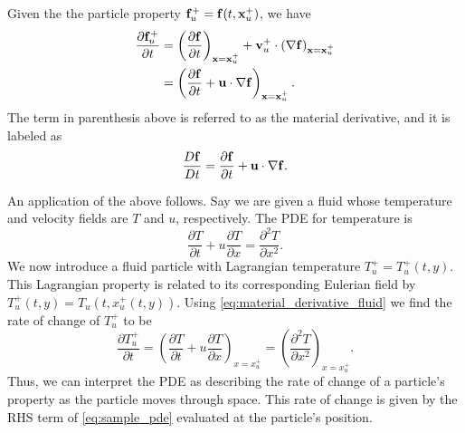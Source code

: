 \documentclass[oneside,a4paper,11pt]{report}
\begin{document}
Given the the particle property $\mathbf{f}^+_u = \mathbf{f}(t,\mathbf{x}^+_u)$, we have
\begin{align}
\label{eq:material_derivative_fluid}
\frac{\partial \mathbf{f}^+_u}{\partial t} &=\left(\frac{\partial \mathbf{f}}{\partial t}\right)_{\mathbf{x}=\mathbf{x}^+_u} + \mathbf{v}^+_u \cdot \left(\nabla \mathbf{f}\right)_{\mathbf{x}=\mathbf{x}^+_u} \nonumber \\
&=\left(\frac{\partial \mathbf{f}}{\partial t} + \mathbf{u} \cdot \nabla \mathbf{f}\right)_{\mathbf{x}=\mathbf{x}^+_u}.
\end{align}
The term in parenthesis above is referred to as the material derivative, and it is labeled as
\begin{equation}
\label{eq:material_derivative_definition}
    \frac{D\mathbf{f}}{Dt} = \frac{\partial \mathbf{f}}{\partial t} + \mathbf{u} \cdot \nabla \mathbf{f}.
\end{equation}

An application of the above follows. Say we are given a fluid whose temperature and velocity fields are $T$ and $u$, respectively. The PDE for temperature is
\begin{equation}
\label{eq:sample_pde}
\frac{\partial T}{\partial t} + u\frac{\partial T}{\partial x} = \frac{\partial^2 T}{\partial x^2}.
\end{equation}
We now introduce a fluid particle with Lagrangian temperature $T^+_u = T^+_u(t,y)$. This Lagrangian property is related to its corresponding Eulerian field by $T^+_u(t,y) = T_u(t,x^+_u(t,y))$. Using \cref{eq:material_derivative_fluid} we find the rate of change of $T^+_u$ to be
\begin{equation}
\frac{\partial T^+_u}{\partial t} = \left( \frac{\partial T}{\partial t} +  u\frac{\partial T}{\partial x} \right)_{x = x^+_u} = \left ( \frac{\partial^2 T}{\partial x^2} \right)_{x = x^+_u}. 
\end{equation}
Thus, we can interpret the PDE as describing the rate of change of a particle's property as the particle moves through space. This rate of change is given by the RHS term of \cref{eq:sample_pde} evaluated at the particle's position. 

\end{document}
